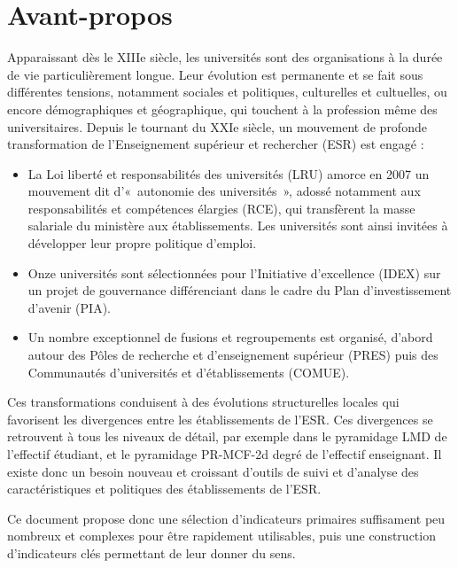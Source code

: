 \documentclass[12pt,french,]{article}
\providecommand{\tightlist}{%
  \setlength{\itemsep}{0pt}\setlength{\parskip}{0pt}}
\begin{document}
\vspace*{\fill}

\hypertarget{avant-propos}{%
\section*{Avant-propos}\label{avant-propos}}

Apparaissant dès le XIIIe siècle, les universités sont des organisations
à la durée de vie particulièrement longue. Leur évolution est permanente
et se fait sous différentes tensions, notamment sociales et politiques,
culturelles et cultuelles, ou encore démographiques et géographique, qui
touchent à la profession même des universitaires. Depuis le tournant du
XXIe siècle, un mouvement de profonde transformation de l'Enseignement
supérieur et rechercher (ESR) est engagé :

\begin{itemize}
\tightlist
\item
  La Loi liberté et responsabilités des universités (LRU) amorce en 2007
  un mouvement dit d'«~autonomie des universités~», adossé notamment aux
  responsabilités et compétences élargies (RCE), qui transfèrent la
  masse salariale du ministère aux établissements. Les universités sont
  ainsi invitées à développer leur propre politique d'emploi.
\item
  Onze universités sont sélectionnées pour l'Initiative d'excellence
  (IDEX) sur un projet de gouvernance différenciant dans le cadre du
  Plan d'investissement d'avenir (PIA).
\item
  Un nombre exceptionnel de fusions et regroupements est organisé,
  d'abord autour des Pôles de recherche et d'enseignement supérieur
  (PRES) puis des Communautés d'universités et d'établissements (COMUE).
\end{itemize}

Ces transformations conduisent à des évolutions structurelles locales
qui favorisent les divergences entre les établissements de l'ESR. Ces
divergences se retrouvent à tous les niveaux de détail, par exemple dans
le pyramidage LMD de l'effectif étudiant, et le pyramidage PR-MCF-2d
degré de l'effectif enseignant. Il existe donc un besoin nouveau et
croissant d'outils de suivi et d'analyse des caractéristiques et
politiques des établissements de l'ESR.

Ce document propose donc une sélection d'indicateurs primaires
suffisament peu nombreux et complexes pour être rapidement utilisables,
puis une construction d'indicateurs clés permettant de leur donner du
sens.
\end{document}
